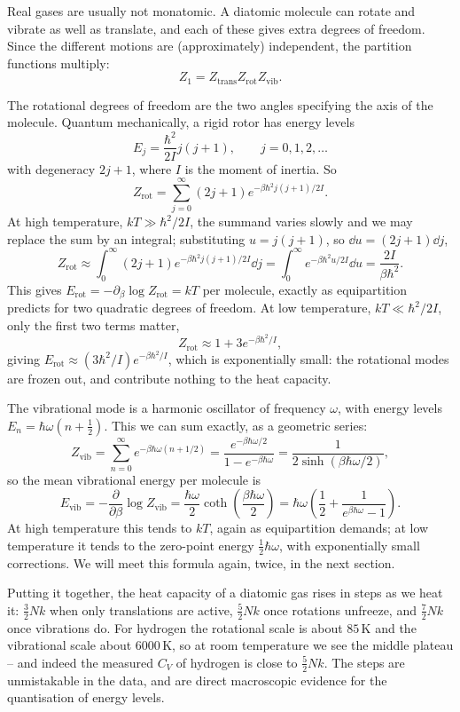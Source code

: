 \documentclass[a4paper]{scrartcl}
\begin{document}
Real gases are usually not monatomic. A diatomic molecule can rotate and vibrate as well as translate, and each of these gives extra degrees of freedom. Since the different motions are (approximately) independent, the partition functions multiply:
$$
Z_1 = Z_{\mathrm{trans}} Z_{\mathrm{rot}} Z_{\mathrm{vib}}.
$$

The rotational degrees of freedom are the two angles specifying the axis of the molecule. Quantum mechanically, a rigid rotor has energy levels
$$
E_j = \frac{\hbar^2}{2I}j(j+1), \qquad j = 0, 1, 2, \dots
$$
with degeneracy $2j+1$, where $I$ is the moment of inertia. So
$$
Z_{\mathrm{rot}} = \sum_{j=0}^\infty (2j+1)e^{-\beta \hbar^2 j(j+1)/2I}.
$$
At high temperature, $kT \gg \hbar^2/2I$, the summand varies slowly and we may replace the sum by an integral; substituting $u = j(j+1)$, so $\dd u = (2j+1)\dd j$,
$$
Z_{\mathrm{rot}} \approx \int_0^\infty (2j+1)e^{-\beta\hbar^2 j(j+1)/2I}\dd j = \int_0^\infty e^{-\beta\hbar^2 u/2I}\dd u = \frac{2I}{\beta\hbar^2}.
$$
This gives $E_{\mathrm{rot}} = -\partial_\beta \log Z_{\mathrm{rot}} = kT$ per molecule, exactly as equipartition predicts for two quadratic degrees of freedom. At low temperature, $kT \ll \hbar^2/2I$, only the first two terms matter,
$$
Z_{\mathrm{rot}} \approx 1 + 3e^{-\beta\hbar^2/I},
$$
giving $E_{\mathrm{rot}} \approx (3\hbar^2/I)e^{-\beta\hbar^2/I}$, which is exponentially small: the rotational modes are frozen out, and contribute nothing to the heat capacity.

The vibrational mode is a harmonic oscillator of frequency $\omega$, with energy levels $E_n = \hbar\omega(n + \tfrac 12)$. This we can sum exactly, as a geometric series:
$$
Z_{\mathrm{vib}} = \sum_{n=0}^\infty e^{-\beta \hbar\omega(n + 1/2)} = \frac{e^{-\beta\hbar\omega/2}}{1 - e^{-\beta\hbar\omega}} = \frac{1}{2\sinh(\beta\hbar\omega/2)},
$$
so the mean vibrational energy per molecule is
$$
E_{\mathrm{vib}} = -\frac{\partial}{\partial\beta}\log Z_{\mathrm{vib}} = \frac{\hbar\omega}{2}\coth\left(\frac{\beta\hbar\omega}{2}\right) = \hbar\omega\left(\frac{1}{2} + \frac{1}{e^{\beta\hbar\omega}-1}\right).
$$
At high temperature this tends to $kT$, again as equipartition demands; at low temperature it tends to the zero-point energy $\tfrac 12 \hbar\omega$, with exponentially small corrections. We will meet this formula again, twice, in the next section.

Putting it together, the heat capacity of a diatomic gas rises in steps as we heat it: $\tfrac 32 Nk$ when only translations are active, $\tfrac 52 Nk$ once rotations unfreeze, and $\tfrac 72 Nk$ once vibrations do. For hydrogen the rotational scale is about $85\,\mathrm{K}$ and the vibrational scale about $6000\,\mathrm{K}$, so at room temperature we see the middle plateau -- and indeed the measured $C_V$ of hydrogen is close to $\tfrac 52 Nk$. The steps are unmistakable in the data, and are direct macroscopic evidence for the quantisation of energy levels.
\end{document}
